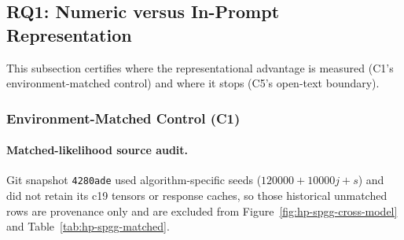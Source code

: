 \subsection{RQ1: Numeric versus In-Prompt Representation}
\label{app:llm-supplements}

This subsection certifies where the representational advantage is measured (C1's environment-matched control) and where it stops (C5's open-text boundary).

\subsubsection{Environment-Matched Control (C1)}

\paragraph{Matched-likelihood source audit.}
\label{app:matched-likelihood-audit}
Git snapshot \texttt{4280ade} used algorithm-specific seeds ($120000+10000j+s$) and did not retain its c19 tensors or response caches, so those historical unmatched rows are provenance only and are excluded from Figure~\ref{fig:hp-spgg-cross-model} and Table~\ref{tab:hp-spgg-matched}.
